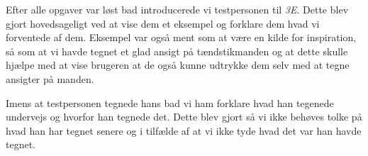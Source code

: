Efter alle opgaver var løst bad introducerede vi testpersonen til \textit{3E}. Dette blev gjort hovedsageligt ved at vise dem et eksempel og forklare dem hvad vi forventede af dem. Eksempel var også ment som at være en kilde for inspiration, så som at vi havde tegnet et glad ansigt på tændstikmanden og at dette skulle hjælpe med at vise brugeren at de også kunne udtrykke dem selv med at tegne ansigter på manden. 

Imens at testpersonen tegnede hans bad vi ham forklare hvad han tegenede undervejs og hvorfor han tegnede det. Dette blev gjort så vi ikke behøves tolke på hvad han har tegnet senere og i tilfælde af at vi ikke tyde hvad det var han havde tegnet.  